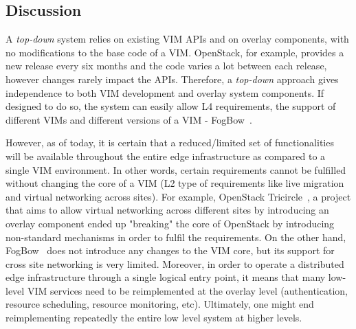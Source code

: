 


\subsection{Discussion}
\label{sec:design_discussion}


A \emph{top-down} system  relies on existing VIM APIs and on overlay components, with no modifications to the base code of a VIM.
OpenStack, for example, provides a new release every six months and the code varies a lot between each release, however changes rarely impact the APIs.  Therefore, a \emph{top-down} approach gives independence to both VIM development and overlay system components. 
If designed to do so, the system can easily allow L4 requirements, \ie the support of different VIMs and different versions of a VIM - \eg FogBow~\cite{brasileiro2016fogbow}.


However, as of today, it is certain that a reduced/limited set of functionalities will be available throughout the entire edge infrastructure as compared to a single VIM environment. In other words, certain requirements cannot be fulfilled without changing the core of a VIM (\eg L2 type of requirements like live migration and virtual networking across sites). For example, OpenStack Tricircle~\cite{tricircle}, a project that aims to allow virtual networking across different sites by introducing an overlay component ended up "breaking" the core of OpenStack by introducing non-standard mechanisms in order to fulfil the requirements. On the other hand, FogBow~\cite{brasileiro2016fogbow} does not introduce any changes to the VIM core, but its support for cross site networking is very limited.
Moreover, in order to operate a distributed edge infrastructure through a single logical entry point, it means that many low-level VIM services need to be reimplemented at the overlay level (\eg authentication, resource scheduling, resource monitoring, etc). Ultimately, one might end reimplementing repeatedly the entire low level system at higher levels.






